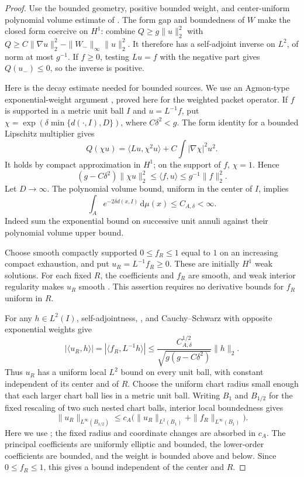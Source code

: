 \documentclass[11pt]{article}
\numberwithin{equation}{section}
\theoremstyle{definition}
\theoremstyle{remark}
\begin{document}
\begin{proof}
Use the bounded geometry, positive bounded weight, and center-uniform
polynomial volume estimate of .  The form gap
and boundedness of $W$ make the closed form coercive on $H^1$:
combine $Q\ge g\|u\|_2^2$ with
$Q\ge C\|\nabla u\|_2^2-\|W_-\|_\infty\|u\|_2^2$.
It therefore has a self-adjoint inverse on $L^2$, of norm at most
$g^{-1}$.  If $f\ge0$, testing $Lu=f$ with the negative part gives
$Q(u_-)\le0$, so the inverse is positive.

Here is the decay estimate needed for bounded sources.  We use an
Agmon-type exponential-weight argument \citep{agmon1982}, proved here
for the weighted packet operator.  If $f$ is
supported in a metric unit ball $I$ and $u=L^{-1}f$, put
$\chi=\exp(\delta\min\{d(\cdot,I),D\})$, where $C\delta^2<g$.
The form identity for a bounded Lipschitz multiplier gives
\[
 Q(\chi u)=\langle Lu,\chi^2u\rangle+
                  C\int|\nabla\chi|^2u^2.
\]
It holds by compact approximation in $H^1$; on the support of $f$,
$\chi=1$.  Hence
\begin{equation}\label{regular:off-diagonal}
 (g-C\delta^2)\|\chi u\|_2^2
 \le\langle f,u\rangle\le g^{-1}\|f\|_2^2.
\end{equation}
Let $D\to\infty$.  The polynomial volume bound, uniform in the
center of $I$, implies
\[
 \int_A e^{-2\delta d(x,I)}\,\mathrm d\mu(x)\le C_{A,\delta}<\infty.
\]
Indeed sum the exponential bound on successive unit annuli against
their polynomial volume upper bound.

Choose smooth compactly supported $0\le f_R\le1$ equal to $1$ on
an increasing compact exhaustion, and put $u_R=L^{-1}f_R\ge0$.
These are initially $H^1$ weak solutions.  For each fixed $R$, the
coefficients and $f_R$ are smooth, and weak interior regularity makes
$u_R$ smooth
\citep[Lecture~6, Theorem~1 and Corollary~1]{simonPDE}.
This assertion requires no derivative bounds for $f_R$ uniform in $R$.

For any $h\in L^2(I)$, self-adjointness,
, and Cauchy--Schwarz with opposite
exponential weights give
\[
 |\langle u_R,h\rangle|
 =|\langle f_R,L^{-1}h\rangle|
 \le\frac{C_{A,\delta}^{1/2}}{\sqrt{g(g-C\delta^2)}}\|h\|_2.
\]
Thus $u_R$ has a uniform local $L^2$ bound on every unit ball, with
constant independent of its center and of $R$.  Choose the uniform
chart radius small enough that each larger chart ball lies in a
metric unit ball.  Writing $B_1$ and $B_{1/2}$ for the fixed rescaling
of two such nested chart balls, interior local boundedness gives
\[
 \|u_R\|_{L^\infty(B_{1/2})}
 \le c_A\bigl(\|u_R\|_{L^2(B_1)}
                      +\|f_R\|_{L^\infty(B_1)}\bigr).
\]
Here we use \citet[Lecture~18, Theorem~2, with $p=2$]{simonPDE};
the fixed radius and coordinate changes are absorbed in $c_A$.
The principal coefficients are
uniformly elliptic and bounded, the lower-order coefficients are
bounded, and the weight is bounded above and below.  Since
$0\le f_R\le1$, this gives a bound independent of the center and $R$.


\end{proof}
\end{document}
